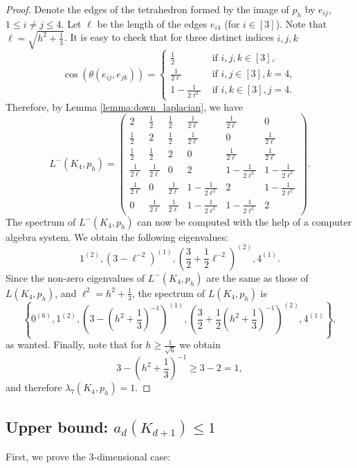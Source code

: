 \documentclass[a4paper,11pt]{article}
\theoremstyle{plain}
\theoremstyle{definition}
\begin{document}
\begin{proof}
Denote the edges of the tetrahedron formed by the image of $p_h$ by $e_{ij}$, $1\leq i\neq j\leq 4$.
Let $\ell$ be the length of the edges $e_{i4}$ (for $i\in[3]$). Note that $\ell=\sqrt{h^2+\frac{1}{3}}$. It is easy to check that for three distinct indices $i,j,k$
\[
    \cos(\theta(e_{ij},e_{jk}))=\begin{cases}
    \frac{1}{2} & \text{ if } i,j,k\in [3],\\
    \frac{1}{2\ell} & \text{ if } i,j\in [3], k=4,\\
    1-\frac{1}{2\ell^2} & \text{ if } i,k\in[3], j=4.
    \end{cases}
\]
Therefore, by Lemma \ref{lemma:down_laplacian}, we have
\[
    L^{-}(K_4,p_h)=\begin{pmatrix}
  2 & \frac{1}{2} & \frac{1}{2} & \frac{1}{2\ell} & \frac{1}{2\ell} & 0\\[5pt]
  \frac{1}{2} & 2 & \frac{1}{2} & \frac{1}{2\ell} & 0 & \frac{1}{2\ell}\\[5pt]
  \frac{1}{2} & \frac{1}{2} & 2 & 0 & \frac{1}{2\ell} & \frac{1}{2\ell}\\[5pt]
  \frac{1}{2\ell} & \frac{1}{2\ell} & 0 & 2 & 1-\frac{1}{2\ell^2} & 1-\frac{1}{2\ell^2}\\[5pt]
  \frac{1}{2\ell} & 0 & \frac{1}{2\ell} & 1-\frac{1}{2\ell^2} & 2 & 1-\frac{1}{2\ell^2}\\[5pt]
  0 & \frac{1}{2\ell} & \frac{1}{2\ell} & 1-\frac{1}{2\ell^2} & 1-\frac{1}{2\ell^2} & 2
\end{pmatrix}.
\]
The spectrum of $L^{-}(K_4,p_h)$ can now be computed with the help of a computer algebra system. We obtain the following eigenvalues:
\[
    1^{(2)},\left(3-\ell^{-2}\right)^{(1)},\left(\frac{3}{2}+\frac{1}{2}\ell^{-2}\right)^{(2)},4^{(1)}.
\]
Since the non-zero eigenvalues of $L^{-}(K_4,p_h)$ are the same as those of $L(K_4,p_h)$, and $\ell^2=h^2+\frac{1}{3}$, the spectrum of $L(K_4,p_h)$ is  \[
  \left\{  0^{(6)},1^{(2)},\left(3-\left(h^2+\frac{1}{3}\right)^{-1}\right)^{(1)},\left(\frac{3}{2}+\frac{1}{2}\left(h^2+\frac{1}{3}\right)^{-1}\right)^{(2)},4^{(1)}\right\},
\]
as wanted. Finally, note that for $h\geq \frac{1}{\sqrt{6}}$ we obtain 
\[
3-(h^2+\frac{1}{3})^{-1}\geq 3-2 =1,
\]
and therefore $\lambda_7(K_4,p_h)=1$.
\end{proof}

\subsection{Upper bound: $a_d(K_{d+1})\le 1$}
First, we prove the $3$-dimensional case:
\end{document}
